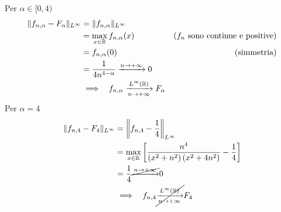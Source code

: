 \begin{enumerate}
Per $\alpha \in [ 0, 4)$
\begin{equation*}
\begin{aligned}
\Vert f_{n, \alpha} - F_{\alpha}\Vert_{L^{\infty}} & = \Vert f_{n, \alpha}\Vert_{L^{\infty}} & \\
 & = \max_{x\in \mathbb{R}} f_{n, \alpha}(x) & \left(f_{n} \ \text{sono continue e positive}\right)\\
 & = f_{n, \alpha}(0) & \text{(simmetria)}\\
 & = \frac{1}{4n^{4 - \alpha}}\xrightarrow{n\rightarrow + \infty} 0 & \\
 & \implies \ \ f_{n, \alpha}\xrightarrow[n\rightarrow + \infty ]{L^{\infty}(\mathbb{R})} F_{\alpha} &
\end{aligned}
\end{equation*}Per $\alpha = 4$
\begin{equation*}
\begin{aligned}
\Vert f_{n, 4} - F_{4}\Vert_{L^{\infty}} & = \left\Vert f_{n, 4} - \frac{1}{4}\right\Vert_{L^{\infty}}\\
 & = \max_{x\in \mathbb{R}}\left[\frac{n^{4}}{\left(x^{2} + n^{2}\right)\left(x^{2} + 4n^{2}\right)} - \frac{1}{4}\right]\\
 & = \frac{1}{4}\cancel{\xrightarrow{n\rightarrow + \infty}} 0\\
 & \implies \ \ f_{n, 4}\cancel{\xrightarrow[n\rightarrow + \infty ]{L^{\infty}(\mathbb{R})}} F_{4}
\end{aligned}
\end{equation*}
\end{enumerate}

\Soluzione

